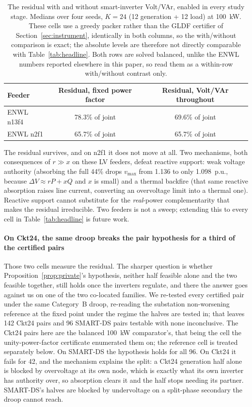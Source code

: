 \documentclass[review,authoryear,12pt]{elsarticle}
\begin{document}
\begin{table}[htbp]
\centering
\caption{The residual with and without smart-inverter Volt/VAr, enabled in
every study stage. Medians over four seeds, $K=24$ (12 generation + 12 load)
at 100~kW. These cells use a greedy packer rather than the GLDF certifier of
Section~\ref{sec:instrument}, identically in both columns, so the with/without
comparison is exact; the absolute levels are therefore not directly comparable
with Table~\ref{tab:headline}. Both rows are solved balanced, unlike the ENWL
numbers reported elsewhere in this paper, so read them as a within-row
with/without contrast only.}
\label{tab:voltvar}
\small
\begin{tabular}{@{}lcc@{}}
\toprule
Feeder & Residual, fixed power factor & Residual, Volt/VAr throughout \\
\midrule
ENWL n13f4 & 78.3\% of joint & 69.6\% of joint \\
ENWL n2f1  & 65.7\% of joint & 65.7\% of joint \\
\bottomrule
\end{tabular}
\end{table}

The residual survives, and on n2f1 it does not move at all. Two mechanisms,
both consequences of $r \gg x$ on these LV feeders, defeat reactive support:
weak voltage authority (absorbing the full 44\% drops $v_{\max}$ from 1.136 to
only 1.098~p.u., because $\Delta V \approx rP + xQ$ and $x$ is small) and a
thermal backfire (that same reactive absorption raises line current,
converting an overvoltage limit into a thermal one). Reactive support cannot
substitute for the \emph{real}-power complementarity that makes the residual
irreducible. Two feeders is not a sweep; extending this to every cell in
Table~\ref{tab:headline} is future work.

\paragraph{On Ckt24, the same droop breaks the pair hypothesis for a third of
the certified pairs} Those two cells measure the residual. The sharper question
is whether Proposition~\ref{prop:private}'s hypothesis, neither half
feasible alone and the two feasible together, still holds once the inverters
regulate, and there the answer goes against us on one of the two co-located
families. We re-tested every certified pair under the same Category~B droop,
re-reading the substation non-worsening reference at the fixed point under the
regime the halves are tested in; that leaves 142 Ckt24 pairs and 96 SMART-DS
pairs testable with none inconclusive. The Ckt24 pairs here are the balanced
100~kW comparator's, that being the cell the unity-power-factor certificate
enumerated them on; the reference cell is treated separately below. On SMART-DS
the hypothesis holds for all
96. On Ckt24 it fails for 42, and the mechanism explains the split: a Ckt24
generation half alone is blocked by overvoltage at its own node, which is
exactly what its own inverter has authority over, so absorption clears it and
the half stops needing its partner. SMART-DS's halves are blocked by
undervoltage on a split-phase secondary the droop cannot reach.
\end{document}
